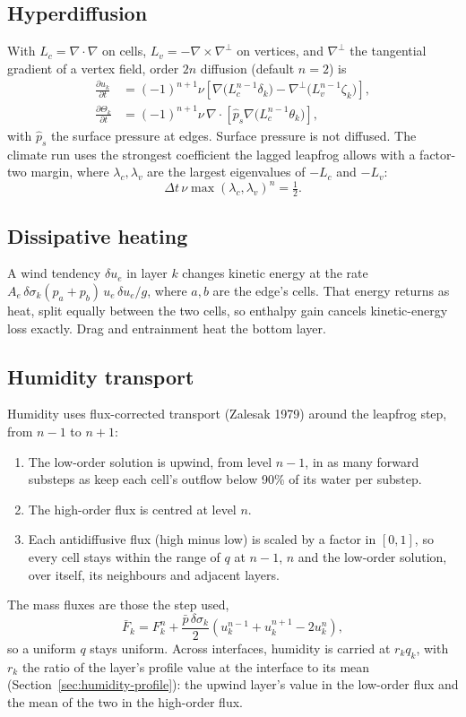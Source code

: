 \documentclass[11pt,a4paper]{article}
\newcommand{\pd}[2]{\frac{\partial #1}{\partial #2}}
\begin{document}
\subsection{Hyperdiffusion}
With $L_c = \nabla\cdot\nabla$ on cells, $L_v = -\nabla\times\nabla^\perp$ on
vertices, and $\nabla^\perp$ the tangential gradient of a vertex field, order $2n$ diffusion (default $n=2$) is
\begin{align}
\pd{u_k}{t} &= (-1)^{n+1}\nu\left[\nabla\bigl(L_c^{n-1}\delta_k\bigr)
   - \nabla^\perp\bigl(L_v^{n-1}\zeta_k\bigr)\right], \\
\pd{\Theta_k}{t} &= (-1)^{n+1}\nu\,\nabla\cdot\left[\hat p_s\nabla\bigl(L_c^{n-1}\theta_k\bigr)\right],
\end{align}
with $\hat p_s$ the surface pressure at edges. Surface pressure is not diffused.
The climate run uses the strongest coefficient the lagged leapfrog allows with a
factor-two margin, where $\lambda_c, \lambda_v$ are the largest eigenvalues of
$-L_c$ and $-L_v$:
\begin{equation}
\Delta t\,\nu\max(\lambda_c,\lambda_v)^n = \tfrac12 .
\end{equation}

\subsection{Dissipative heating}
A wind tendency $\delta u_e$ in layer $k$ changes kinetic energy at the rate
$A_e\,\delta\sigma_k(p_a + p_b)\,u_e\,\delta u_e/g$, where $a, b$ are the edge's
cells. That energy returns as heat, split equally between the two cells, so
enthalpy gain cancels kinetic-energy loss exactly. Drag and entrainment heat the
bottom layer.

\subsection{Humidity transport}
Humidity uses flux-corrected transport (Zalesak 1979) around the leapfrog step,
from $n-1$ to $n+1$:
\begin{enumerate}
\item The low-order solution is upwind, from level $n-1$, in as many forward
  substeps as keep each cell's outflow below 90\% of its water per substep.
\item The high-order flux is centred at level $n$.
\item Each antidiffusive flux (high minus low) is scaled by a factor in $[0,1]$, so
  every cell stays within the range of $q$ at $n-1$, $n$ and the low-order solution,
  over itself, its neighbours and adjacent layers.
\end{enumerate}
The mass fluxes are those the step used,
\begin{equation}
\bar F_k = F_k^n + \frac{\bar p\,\delta\sigma_k}{2}
   \left(u_k^{n-1} + u_k^{n+1} - 2u_k^n\right),
\end{equation}
so a uniform $q$ stays uniform. Across interfaces, humidity is carried at
$r_k q_k$, with $r_k$ the ratio of the layer's profile value at the interface to
its mean (Section~\ref{sec:humidity-profile}): the upwind layer's value in the
low-order flux and the mean of the two in the high-order flux.
\end{document}
